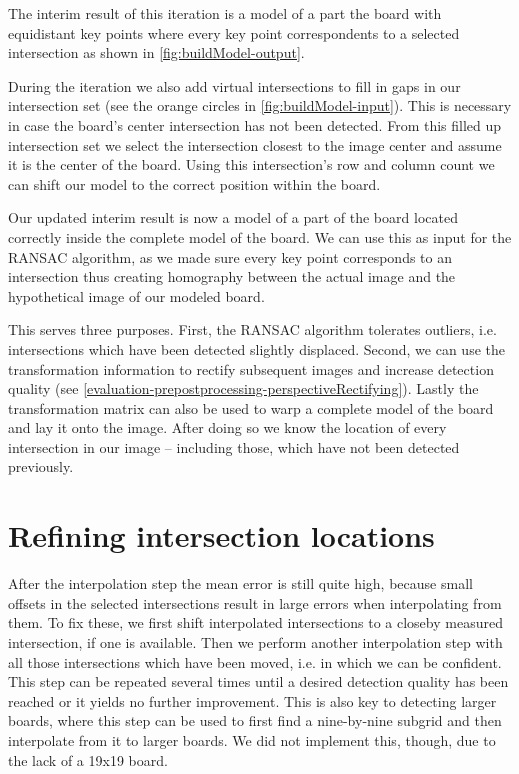 	The interim result of this iteration is a model of a part the board with equidistant key points where every key point correspondents to a selected intersection as shown in \autoref{fig:buildModel-output}.

	During the iteration we also add virtual intersections to fill in gaps in our intersection set (see the orange circles in \autoref{fig:buildModel-input}). This is necessary in case the board's center intersection has not been detected. From this filled up intersection set we select the intersection closest to the image center and assume it is the center of the board. Using this intersection's row and column count we can shift our model to the correct position within the board.

	Our updated interim result is now a model of a part of the board located correctly inside the complete model of the board. We can use this as input for the RANSAC algorithm, as we made sure every key point corresponds to an intersection thus creating homography between the actual image and the hypothetical image of our modeled board.

	This serves three purposes. First, the RANSAC algorithm tolerates outliers, i.e. intersections which have been detected slightly displaced. Second, we can use the transformation information to rectify subsequent images and increase detection quality (see \ref{evaluation-prepostprocessing-perspectiveRectifying}). Lastly the transformation matrix can also be used to warp a complete model of the board and lay it onto the image. After doing so we know the location of every intersection in our image -- including those, which have not been detected previously.

	\section{Refining intersection locations}
	\label{detector-postprocessing}
	After the interpolation step the mean error is still quite high, because small offsets in the selected intersections result in large errors when interpolating from them. To fix these, we first shift interpolated intersections to a closeby measured intersection, if one is available. Then we perform another interpolation step with all those intersections which have been moved, i.e. in which we can be confident. This step can be repeated several times until a desired detection quality has been reached or it yields no further improvement. This is also key to detecting larger boards, where this step can be used to first find a nine-by-nine subgrid and then interpolate from it to larger boards. We did not implement this, though, due to the lack of a 19x19 board.

